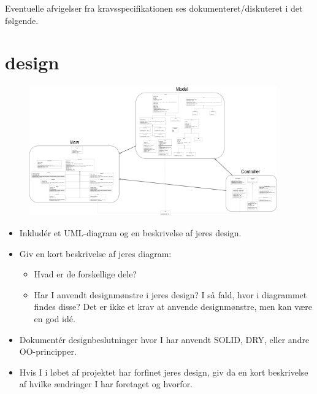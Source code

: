\documentclass{article}
\theoremstyle{mytheoremstyle}
\theoremstyle{mytheoremstyle}
\theoremstyle{myproblemstyle}
\begin{document}
Eventuelle afvigelser fra kravsspecifikationen ses dokumenteret/diskuteret i det følgende.
\newpage

\section{design}\label{sec:design} %

\begin{figure}
    \begin{center}
        \includegraphics[width=0.95\textwidth]{figures/UML-diagram.png}
    \end{center}
    \caption{}
    \label{fig:}
\end{figure}


\begin{itemize}
  \item Inkludér et UML-diagram og en beskrivelse af jeres design.
  \item Giv en kort beskrivelse af jeres diagram:
  \begin{itemize}
    \item Hvad er de forskellige dele?
    \item Har I anvendt designmønstre i jeres design? I så fald, hvor i
    diagrammet findes disse? Det er ikke et krav at anvende designmønstre, men
    kan være en god idé.
  \end{itemize}
  \item Dokumentér designbeslutninger hvor I har anvendt SOLID, DRY, eller andre
  OO-principper. 
  \item Hvis I i løbet af projektet har forfinet jeres design,
  giv da en kort beskrivelse af hvilke ændringer I har foretaget og hvorfor.
\end{itemize}
\end{document}
